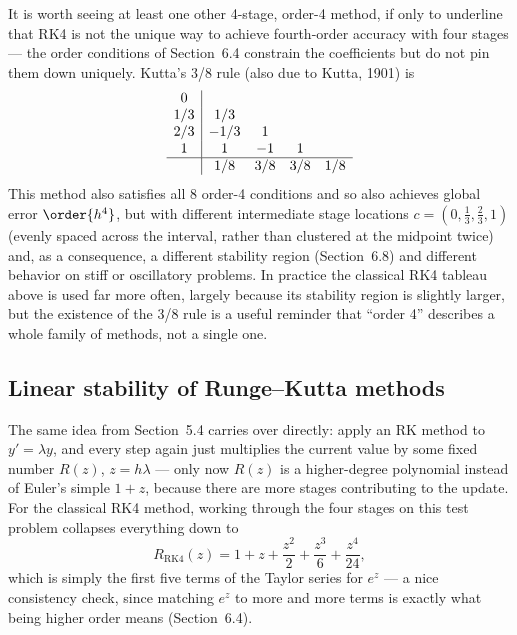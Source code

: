 It is worth seeing at least one other 4-stage, order-4 method, if only to underline that RK4 is not the unique way to achieve fourth-order accuracy with four stages --- the order conditions of Section~6.4 constrain the coefficients but do not pin them down uniquely. Kutta's 3/8 rule (also due to Kutta, 1901) is
\begin{equation}
\begin{array}{c|cccc}
0 & & & & \\
1/3 & 1/3 & & & \\
2/3 & -1/3 & 1 & & \\
1 & 1 & -1 & 1 & \\ \hline
 & 1/8 & 3/8 & 3/8 & 1/8
\end{array}
\end{equation}
This method also satisfies all 8 order-4 conditions and so also achieves global error $\order{h^4}$, but with different intermediate stage locations $c=(0,\tfrac13,\tfrac23,1)$ (evenly spaced across the interval, rather than clustered at the midpoint twice) and, as a consequence, a different stability region (Section~6.8) and different behavior on stiff or oscillatory problems. In practice the classical RK4 tableau above is used far more often, largely because its stability region is slightly larger, but the existence of the 3/8 rule is a useful reminder that ``order 4'' describes a whole family of methods, not a single one.

\subsection{Linear stability of Runge--Kutta methods}

The same idea from Section~5.4 carries over directly: apply an RK method to $y'=\lambda y$, and every step again just multiplies the current value by some fixed number $R(z)$, $z=h\lambda$ --- only now $R(z)$ is a higher-degree polynomial instead of Euler's simple $1+z$, because there are more stages contributing to the update. For the classical RK4 method, working through the four stages on this test problem collapses everything down to
\begin{equation}
R_{\mathrm{RK4}}(z) = 1 + z + \frac{z^2}{2} + \frac{z^3}{6} + \frac{z^4}{24},
\end{equation}
which is simply the first five terms of the Taylor series for $e^z$ --- a nice consistency check, since matching $e^z$ to more and more terms is exactly what being higher order means (Section~6.4).

